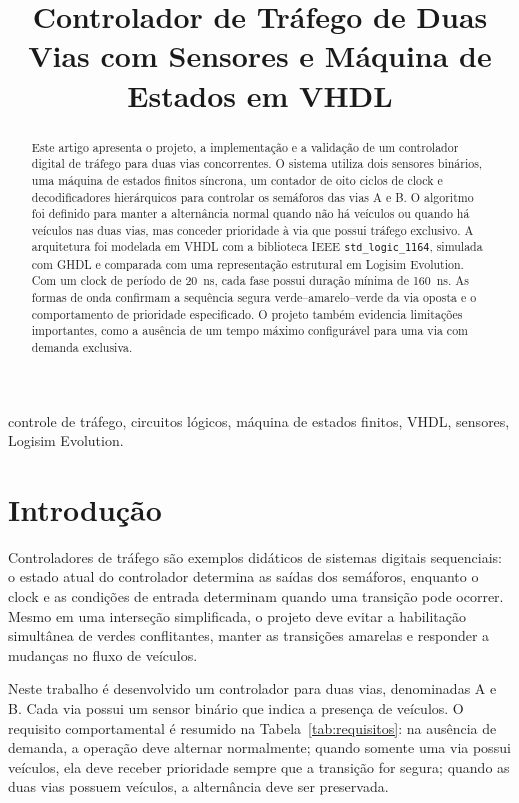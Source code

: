 \documentclass[conference]{IEEEtran}
\title{Controlador de Tráfego de Duas Vias com Sensores e Máquina de Estados em VHDL}
\author{
\IEEEauthorblockN{Thais Evelin Barbosa da Silva}
\IEEEauthorblockA{
Bacharelado em Tecnologia da Informação\\
Universidade Federal do Rio Grande do Norte -- Campus Natal\\
Disciplina de Circuitos Lógicos\\
Natal, RN, Brasil\\
thais.silva.162@ufrn.edu.br\\
\url{https://github.com/ThaisEv/controlador-de-trafego-CL}}
}
\begin{document}
\maketitle

\begin{abstract}
Este artigo apresenta o projeto, a implementação e a validação de um
controlador digital de tráfego para duas vias concorrentes. O sistema utiliza
dois sensores binários, uma máquina de estados finitos síncrona, um contador
de oito ciclos de clock e decodificadores hierárquicos para controlar os
semáforos das vias A e B. O algoritmo foi definido para manter a alternância
normal quando não há veículos ou quando há veículos nas duas vias, mas
conceder prioridade à via que possui tráfego exclusivo. A arquitetura foi
modelada em VHDL com a biblioteca IEEE \texttt{std\_logic\_1164}, simulada com
GHDL e comparada com uma representação estrutural em Logisim Evolution. Com
um clock de período de 20~ns, cada fase possui duração mínima de 160~ns.
As formas de onda confirmam a sequência segura
verde--amarelo--verde da via oposta e o comportamento de prioridade
especificado. O projeto também evidencia limitações importantes, como a
ausência de um tempo máximo configurável para uma via com demanda exclusiva.
\end{abstract}

\begin{IEEEkeywords}
controle de tráfego, circuitos lógicos, máquina de estados finitos, VHDL,
sensores, Logisim Evolution.
\end{IEEEkeywords}

\section{Introdução}
\label{sec:introducao}

Controladores de tráfego são exemplos didáticos de sistemas digitais
sequenciais: o estado atual do controlador determina as saídas dos
semáforos, enquanto o clock e as condições de entrada determinam quando uma
transição pode ocorrer. Mesmo em uma interseção simplificada, o projeto deve
evitar a habilitação simultânea de verdes conflitantes, manter as transições
amarelas e responder a mudanças no fluxo de veículos.

Neste trabalho é desenvolvido um controlador para duas vias, denominadas A e
B. Cada via possui um sensor binário que indica a presença de veículos. O
requisito comportamental é resumido na Tabela~\ref{tab:requisitos}: na
ausência de demanda, a operação deve alternar normalmente; quando somente uma
via possui veículos, ela deve receber prioridade sempre que a transição for
segura; quando as duas vias possuem veículos, a alternância deve ser
preservada.
\end{document}
